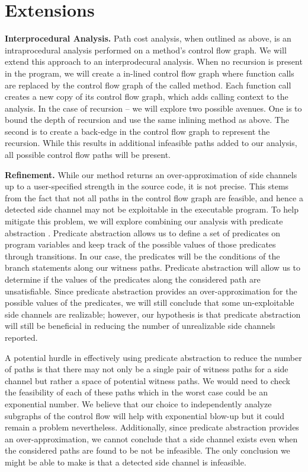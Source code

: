 \section{Extensions}
\textbf{Interprocedural Analysis.} Path cost analysis, when outlined as above, is an intraprocedural analysis performed on a method's control flow graph. We will extend this approach to an interprodecural analysis. When no recursion is present in the program, we will create a in-lined control flow graph where function calls are replaced by the control flow graph of the called method. Each function call creates a new copy of its control flow graph, which adds calling context to the analysis. In the case of recursion -- we will explore two possible avenues. One is to bound the depth of recursion and use the same inlining method as above. The second is to create a back-edge in the control flow graph to represent the recursion. While this results in additional infeasible paths added to our analysis, all possible control flow paths will be present. 

\textbf{Refinement.} While our method returns an over-approximation of side channels up to a user-specified strength in the source code, it is not precise. This stems from the fact that not all paths in the control flow graph are feasible, and hence a detected side channel may not be exploitable in the executable program. To help mitigate this problem, we will explore combining our analysis with predicate abstraction \cite{predicate}. Predicate abstraction allows us to define a set of predicates on program variables and keep track of the possible values of those predicates through transitions. In our case, the predicates will be the conditions of the branch statements along our witness paths. Predicate abstraction will allow us to determine if the values of the predicates along the considered path are unsatisfiable. Since predicate abstraction provides an over-approximation for the possible values of the predicates, we will still conclude that some un-exploitable side channels are realizable; however, our hypothesis is that predicate abstraction will still be beneficial in reducing the number of unrealizable side channels reported. 

A potential hurdle in effectively using predicate abstraction to reduce the number of paths is that there may not only be a single pair of witness paths for a side channel but rather a space of potential witness paths. We would need to check the feasibility of each of these paths which in the worst case could be an exponential number. We believe that our choice to independently analyze subgraphs of the control flow will help with exponential blow-up but it could remain a problem nevertheless. Additionally, since predicate abstraction provides an over-approximation, we cannot conclude that a side channel exists even when the considered paths are found to be not be infeasible. The only conclusion we might be able to make is that a detected side channel is infeasible. 

